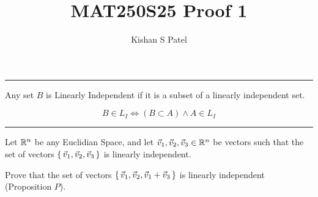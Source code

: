 \documentclass{exam}
\theoremstyle{plain}
\theoremstyle{definition}
\begin{document}
\title{MAT250S25 Proof 1}
\author{Kishan S Patel}
\maketitle



\noindent \rule{\textwidth}{1pt}
\linebreak

\begin{thereom}
	Any set $B$ is Linearly Independent if it is a subset of a linearly independent set.

	$$B \in L_I \iff  (B \subset A)  \wedge A \in L_I $$

	\label{subset}
\end{thereom}
\noindent \rule{\textwidth}{1pt}
\linebreak

Let ${\mathbb R}^n$ be any Euclidian Space, and let $\vec v_1, \vec v_2, \vec v_3 \in {\mathbb R}^n$ be vectors such that the set
of vectors $\set{\vec v_1, \vec v_2, \vec v_3}$ is linearly independent.


Prove that the set of vectors $\set{\vec v_1, \vec v_2, \vec v_1 + \vec v_3}$ is linearly independent (Proposition $P$).

\renewcommand\qedsymbol{QED}


\end{document}
